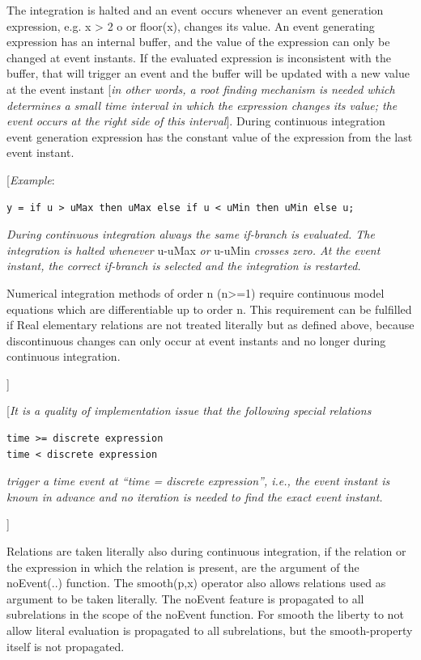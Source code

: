 \documentclass[10pt,a4paper]{report}
\begin{document}
The integration is halted and an event occurs whenever an event
generation expression, e.g. x \textgreater{} 2 o or floor(x), changes
its value. An event generating expression has an internal buffer, and
the value of the expression can only be changed at event instants. If
the evaluated expression is inconsistent with the buffer, that will
trigger an event and the buffer will be updated with a new value at the
event instant {[}\emph{in other words, a root finding mechanism is
needed which determines a small time interval in which the expression
changes its value; the event occurs at the right side of this
interval}{]}. During continuous integration event generation expression
has the constant value of the expression from the last event instant.

{[}\emph{Example}:
\begin{lstlisting}[language=modelica]
y = if u > uMax then uMax else if u < uMin then uMin else u;
\end{lstlisting}

\emph{During continuous integration always the same if-branch is
evaluated. The integration is halted whenever} u-uMax \emph{or} u-uMin
\emph{crosses zero. At the event instant, the correct if-branch is
selected and the integration is restarted.}

Numerical integration methods of order n (n\textgreater{}=1) require
continuous model equations which are differentiable up to order n. This
requirement can be fulfilled if Real elementary relations are not
treated literally but as defined above, because discontinuous changes
can only occur at event instants and no longer during continuous
integration.

{]}

{[}\emph{It is a quality of implementation issue that the following
special relations}
\begin{lstlisting}[language=modelica]
time >= discrete expression
time < discrete expression
\end{lstlisting}

\emph{trigger a time event at ``time = discrete expression'', i.e., the
event instant is known in advance and no iteration is needed to find the
exact event instant.}

{]}

Relations are taken literally also during continuous integration, if the
relation or the expression in which the relation is present, are the
argument of the noEvent(..) function. The smooth(p,x) operator also
allows relations used as argument to be taken literally. The noEvent
feature is propagated to all subrelations in the scope of the noEvent
function. For smooth the liberty to not allow literal evaluation is
propagated to all subrelations, but the smooth-property itself is not
propagated.
\end{document}
